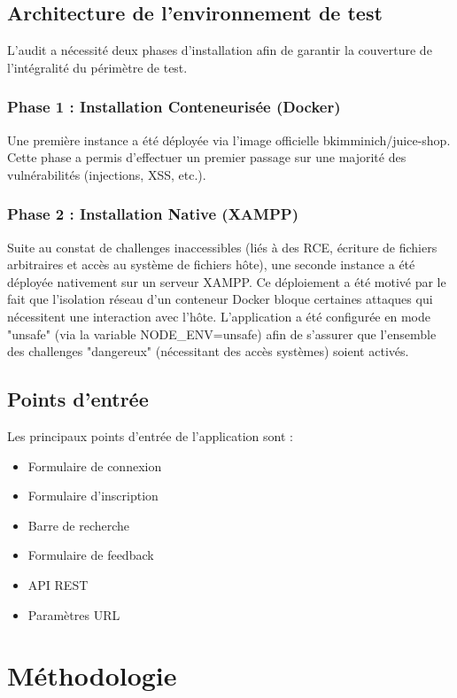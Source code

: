 \documentclass[12pt,a4paper]{report}
\begin{document}
\section{Architecture de l'environnement de test}
L'audit a nécessité deux phases d'installation afin de garantir la couverture de l'intégralité du périmètre de test.

\subsection{Phase 1 : Installation Conteneurisée (Docker)}
Une première instance a été déployée via l'image officielle bkimminich/juice-shop. Cette phase a permis d'effectuer un premier passage sur une majorité des vulnérabilités (injections, XSS, etc.).

\subsection{Phase 2 : Installation Native (XAMPP)}
Suite au constat de challenges inaccessibles (liés à des RCE, écriture de fichiers arbitraires et accès au système de fichiers hôte), une seconde instance a été déployée nativement sur un serveur XAMPP. Ce déploiement a été motivé par le fait que l'isolation réseau d'un conteneur Docker bloque certaines attaques qui nécessitent une interaction avec l'hôte. L'application a été configurée en mode "unsafe" (via la variable NODE\_ENV=unsafe) afin de s'assurer que l'ensemble des challenges "dangereux" (nécessitant des accès systèmes) soient activés.

\section{Points d'entrée}
Les principaux points d'entrée de l'application sont :
\begin{itemize}
    \item Formulaire de connexion
    \item Formulaire d'inscription
    \item Barre de recherche
    \item Formulaire de feedback
    \item API REST
    \item Paramètres URL
\end{itemize}

\chapter{Méthodologie}
\end{document}

